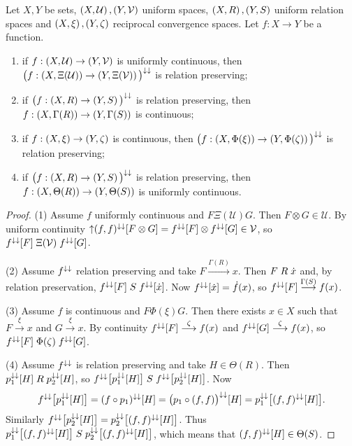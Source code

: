 \begin{proposition}
Let $X,Y$ be sets, $\left( X,\mathcal{U} \right), \left( Y,\mathcal{V} \right)$ uniform spaces, $\left( X,R \right), \left( Y,S \right)$ uniform relation spaces and $\left( X,\xi \right), \left( Y,\zeta \right)$ reciprocal convergence spaces. Let $f: X\to Y$ be a function.
\begin{enumerate}
\item if $f: \left( X,\mathcal{U} \right) \to \left( Y,\mathcal{V} \right)$ is uniformly continuous, then $\big(f: \left( X,\Xi(\mathcal{U}) \right) \to \left( Y,\Xi(\mathcal{V}) \right)\big)^{\downarrow\downarrow}$ is relation preserving;
\item if $\big(f: \left( X,R \right) \to \left( Y,S \right)\big)^{\downarrow\downarrow}$ is relation preserving, then $f: \left( X,\Gamma(R) \right) \to \left( Y,\Gamma(S) \right)$ is continuous;
\item if $f: \left( X,\xi \right) \to \left( Y,\zeta \right)$ is continuous, then $\big(f: \left( X,\Phi(\xi) \right) \to \left( Y,\Phi(\zeta) \right)\big)^{\downarrow\downarrow}$ is relation preserving;
\item if $\big(f: \left( X,R \right) \to \left( Y,S \right)\big)^{\downarrow\downarrow}$ is relation preserving, then $f: \left( X,\Theta(R) \right) \to \left( Y,\Theta(S) \right)$ is uniformly continuous.
\end{enumerate}
\end{proposition}
\begin{proof}
(1) Assume $f$ uniformly continuous and $F\mathrel{\Xi(\mathcal{U})} G$. Then $F\otimes G\in \mathcal{U}$. By uniform continuity $\operatorname{\uparrow} (f, f)^{\downarrow\downarrow}[F\otimes G] = f^{\downarrow\downarrow}[F] \otimes f^{\downarrow\downarrow}[G] \in \mathcal{V}$, so $f^{\downarrow\downarrow}[F] \mathrel{\Xi(\mathcal{V})} f^{\downarrow\downarrow}[G]$.

(2) Assume $f^{\downarrow\downarrow}$ relation preserving and take $F \overset{\Gamma(R)}{\longrightarrow} x$. Then $F\mathrel{R}\dot{x}$ and, by relation preservation, $f^{\downarrow\downarrow}[F]\mathrel{S}f^{\downarrow\downarrow}[\dot{x}]$. Now $f^{\downarrow\downarrow}[\dot{x}] = \dot{f}(x)$, so $f^{\downarrow\downarrow}[F] \overset{\Gamma(S)}{\longrightarrow} f(x)$.

(3) Assume $f$ is continuous and $F\mathrel{\Phi(\xi)} G$. Then there exists $x\in X$ such that $F\overset{\xi}{\longrightarrow} x$ and $G\overset{\xi}{\longrightarrow} x$. By continuity $f^{\downarrow\downarrow}[F]\overset{\zeta}{\longrightarrow} f(x)$ and $f^{\downarrow\downarrow}[G]\overset{\zeta}{\longrightarrow} f(x)$, so $f^{\downarrow\downarrow}[F] \mathrel{\Phi(\zeta)} f^{\downarrow\downarrow}[G]$.

(4) Assume $f^{\downarrow\downarrow}$ is relation preserving and take $H\in \Theta(R)$. Then $p_1^{\downarrow\downarrow}[H]\mathrel{R}p_2^{\downarrow\downarrow}[H]$, so $f^{\downarrow\downarrow}\big[p_1^{\downarrow\downarrow}[H]\big]\mathrel{S}f^{\downarrow\downarrow}\big[p_2^{\downarrow\downarrow}[H]\big]$. Now
\[ f^{\downarrow\downarrow}\big[p_1^{\downarrow\downarrow}[H]\big] = (f\circ p_1)^{\downarrow\downarrow}[H] = \big(p_1\circ(f,f) \big)^{\downarrow\downarrow}[H] = p_1^{\downarrow\downarrow}\big[(f,f)^{\downarrow\downarrow}[H]\big]. \]
Similarly $f^{\downarrow\downarrow}\big[p_2^{\downarrow\downarrow}[H]\big] = p_2^{\downarrow\downarrow}\big[(f,f)^{\downarrow\downarrow}[H]\big]$. Thus $p_1^{\downarrow\downarrow}\big[(f,f)^{\downarrow\downarrow}[H]\big]\mathrel{S}p_2^{\downarrow\downarrow}\big[(f,f)^{\downarrow\downarrow}[H]\big]$, which means that $(f,f)^{\downarrow\downarrow}[H]\in \Theta(S)$.
\end{proof}
